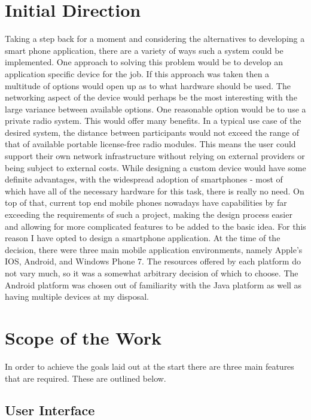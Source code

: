 \section{Initial Direction}

Taking a step back for a moment and considering the alternatives to developing a smart phone application, there are a variety of ways such a system could be implemented. One approach to solving this problem would be to develop an application specific device for the job. If this approach was taken then a multitude of options would open up as to what hardware should be used.
The networking aspect of the device would perhaps be the most interesting with the large variance between available options.
One reasonable option would be to use a private radio system. This would offer many benefits. In a typical use case of the desired system, the distance between participants would not exceed the range of that of available portable license-free radio modules. This means the user could support their own network infrastructure without relying on external providers or being subject to external costs.
While designing a custom device would have some definite advantages, with the widespread adoption of smartphones - most of which have all of the necessary hardware for this task, there is really no need.
On top of that, current top end mobile phones nowadays have capabilities by far exceeding the requirements of such a project, making the design process easier and allowing for more complicated features to be added to the basic idea.
For this reason I have opted to design a smartphone application. At the time of the decision, there were three main mobile application environments, namely Apple's IOS, Android, and Windows Phone 7. The resources offered by each platform do not vary much, so it was a somewhat arbitrary decision of which to choose. The Android platform was chosen out of familiarity with the Java platform as well as having multiple devices at my disposal.

\section{Scope of the Work}

In order to achieve the goals laid out at the start there are three main features that are required. These are outlined below.

\subsection{User Interface}


